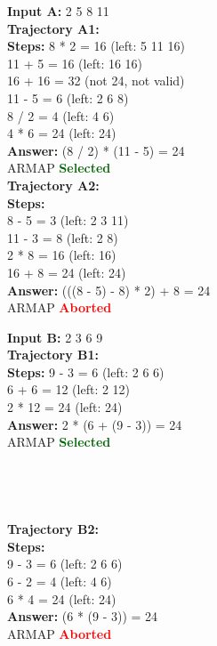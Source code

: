 \begin{tcolorbox}[breakable,title=Qualitative Visualization for Game of 24]
\begin{minipage}[t]{0.5\textwidth}
\textcolor{my_blue!50}{\textbf{Input A:} 2 5 8 11}\\
\textcolor{my_green!50}{\textbf{Trajectory A1:} }\\
\textcolor{my_purple}{\textbf{Steps:} 8 * 2 = 16 (left: 5 11 16)\\11 + 5 = 16 (left: 16 16)\\16 + 16 = 32 (not 24, not valid)\\11 - 5 = 6 (left: 2 6 8)\\8 / 2 = 4 (left: 4 6)\\4 * 6 = 24 (left: 24)\\\textbf{Answer:} (8 / 2) * (11 - 5) = 24}\\
ARMAP \textcolor{darkgreen}{\textbf{Selected}}\\

\textcolor{my_green!50}{\textbf{Trajectory A2:} }\\
\textcolor{my_purple}{\textbf{Steps:}\\8 - 5 = 3 (left: 2 3 11)\\11 - 3 = 8 (left: 2 8)\\2 * 8 = 16 (left: 16)\\16 + 8 = 24 (left: 24)\\ \textbf{Answer:} (((8 - 5) - 8) * 2) + 8 = 24}\\
ARMAP \textcolor{red}{\textbf{Aborted}}\\
\end{minipage}
\begin{minipage}[t]{0.5\textwidth}
\textcolor{my_blue!50}{\textbf{Input B:} 2 3 6 9}\\
\textcolor{my_green!50}{\textbf{Trajectory B1:} }\\
\textcolor{my_purple}{\textbf{Steps:} 9 - 3 = 6 (left: 2 6 6)\\6 + 6 = 12 (left: 2 12)\\2 * 12 = 24 (left: 24)\\ \textbf{Answer: }2 * (6 + (9 - 3)) = 24}\\
ARMAP \textcolor{darkgreen}{\textbf{Selected}}\\
\\
\\
\\
\\
\textcolor{my_green!50}{\textbf{Trajectory B2:} }\\
\textcolor{my_purple}{\textbf{Steps:}\\9 - 3 = 6 (left: 2 6 6)\\6 - 2 = 4 (left: 4 6)\\6 * 4 = 24 (left: 24)\\ \textbf{Answer:} (6 * (9 - 3)) = 24}\\
ARMAP \textcolor{red}{\textbf{Aborted}}\\
\end{minipage}
\end{tcolorbox}

